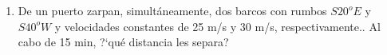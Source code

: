 \begin{enumerate}
\item	 De un puerto zarpan, simultáneamente, dos barcos con rumbos $S20^oE$ y $S40^oW$ y velocidades constantes de 25 m/s y 30 m/s, respectivamente.. Al cabo de 15 min, ?`qué distancia les separa?

\vspace{-8mm}
\begin{flushright}
\begin{footnotesize} \textcolor{gris}{}	\end{footnotesize}
\end{flushright}


\end{enumerate}


\vspace{1.5cm}%


